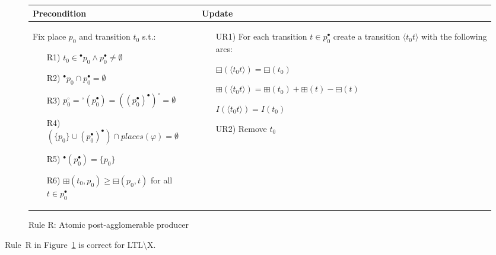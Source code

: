 \begin{figure}[h!]
    \begin{adjustbox}{center}
        \begin{tabular}{|p{68mm}|p{75mm}|} \hline
        Precondition & Update \\ \hline
        Fix place $p_0$ and transition $t_0$ s.t.:
        \begin{itemize}[leftmargin=10mm]
            \item[R1)] $t_0\in {}^\bullet p_0\land p_0^\bullet\neq\emptyset$
            \item[R2)] $^\bullet p_0 \cap p_0^\bullet = \emptyset$
            \item[R3)] $p_0 ^\circ = {}^\circ (p_0^\bullet) = ((p_0^\bullet)^\bullet)^\circ = \emptyset$
            \item[R4)] $(\{p_0\} \cup (p_0^\bullet)^\bullet) \cap places(\varphi) = \emptyset$
            \item[R5)] ${}^\bullet (p_0^\bullet)=\{p_0\}$
            \item[R6)] $\boxplus(t_0, p_0)\geq \boxminus(p_0,t)$ for all $t\in p_0^\bullet$
        \end{itemize} &

        \begin{itemize}[leftmargin=10mm]
            \item[UR1)]
            For each transition $t \in p_0^\bullet$ create a transition $\langle t_0 t\rangle$ with the following arcs:

            $\boxminus(\langle t_0 t\rangle)=\boxminus(t_0)$

            $\boxplus(\langle t_0 t\rangle)=\boxplus(t_0)+\boxplus(t)-\boxminus(t)$

            $I(\langle t_0 t\rangle)=I(t_0)$

            \item[UR2)] Remove $t_0$
        \end{itemize} \\ \hline
        \end{tabular}
    \end{adjustbox}
    \caption{Rule R: Atomic post-agglomerable producer}
    \label{fig:rule_r}
\end{figure}

\begin{theorem}
    Rule~R in Figure~\ref{fig:rule_r} is correct for LTL\textbackslash X.
\end{theorem}
